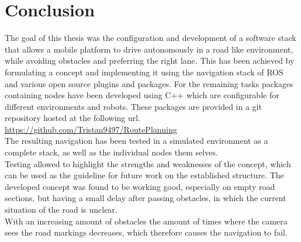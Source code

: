 \chapter{Conclusion}
\label{Conclusion}
The goal of this thesis was the configuration and development of a software stack that allows a mobile platform to drive autonomously in a road like environment, while avoiding obstacles and preferring the right lane.
This has been achieved by formulating a concept and implementing it using the navigation stack of ROS and various open source plugins and packages.
For the remaining tasks packages containing nodes have been developed using C++ which are configurable for different environments and robots. These packages are provided in a git repository hosted at the following url.\\

\url{https://github.com/Tristan9497/RoutePlanning}\\

The resulting navigation has been tested in a simulated environment as a complete stack, as well as the individual nodes them selves.\\

Testing allowed to highlight the strengths and weaknesses of the concept, which can be used as the guideline for future work on the established structure. The developed concept was found to be working good, especially on empty road sections, but having a small delay after passing obstacles, in which the current situation of the road is unclear.\\

With an increasing amount of obstacles the amount of times where the camera sees the road markings decreases, which therefore causes the navigation to fail.
